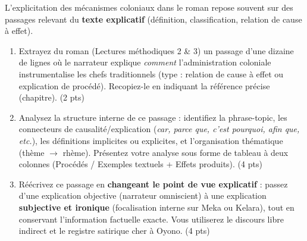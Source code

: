 \documentclass[11pt]{article}
\begin{document}
\begin{exercice}
L'explicitation des mécanismes coloniaux dans le roman repose souvent sur des passages relevant du \textbf{texte explicatif} (définition, classification, relation de cause à effet).

\begin{enumerate}
    \item Extrayez du roman (Lectures méthodiques 2 \& 3) un passage d'une dizaine de lignes où le narrateur explique \textit{comment} l'administration coloniale instrumentalise les chefs traditionnels (type : relation de cause à effet ou explication de procédé). Recopiez-le en indiquant la référence précise (chapitre). (2 pts)
    \item Analysez la structure interne de ce passage : identifiez la phrase-topic, les connecteurs de causalité/explication (\textit{car, parce que, c'est pourquoi, afin que, etc.}), les définitions implicites ou explicites, et l'organisation thématique (thème $\rightarrow$ rhème). Présentez votre analyse sous forme de tableau à deux colonnes (Procédés / Exemples textuels + Effets produits). (4 pts)
    \item Réécrivez ce passage en \textbf{changeant le point de vue explicatif} : passez d'une explication objective (narrateur omniscient) à une explication \textbf{subjective et ironique} (focalisation interne sur Meka ou Kelara), tout en conservant l'information factuelle exacte. Vous utiliserez le discours libre indirect et le registre satirique cher à Oyono. (4 pts)
\end{enumerate}
\end{exercice}
\end{document}

